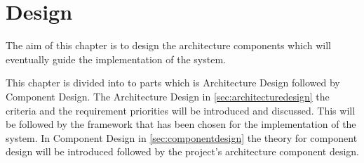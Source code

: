 \chapter{Design}\label{design}
The aim of this chapter is to design the architecture components which will eventually guide the implementation of the system.

This chapter is divided into to parts which is Architecture Design followed by Component Design.
The Architecture Design in \cref{sec:architecturedesign} the criteria and the requirement priorities will be introduced and discussed.
This will be followed by the framework that has been chosen for the implementation of the system.
In Component Design in \cref{sec:componentdesign} the theory for component design will be introduced followed by the project's architecture component design.



